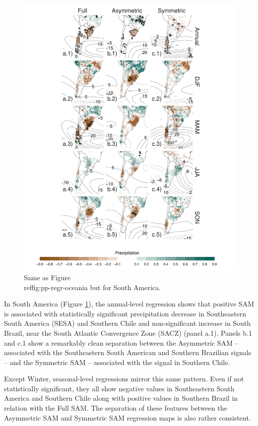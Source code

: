 \documentclass[smallextended]{svjour3}       %
\begin{document}
\begin{figure}
\includegraphics{pp-regr-america-1} \caption{Same as Figure \\ref{fig:pp-regr-oceania} but for South America.}\label{fig:pp-regr-america}
\end{figure}

In South America (Figure \ref{fig:pp-regr-america}), the annual-level regression shows that positive SAM is associated with statistically significant precipitation decrease in Southeastern South America (SESA) and Southern Chile and non-significant increase in South Brazil, near the South Atlantic Convergence Zone (SACZ) (panel a.1). Panels b.1 and c.1 show a remarkably clean separation between the Asymmetric SAM -- associated with the Southeastern South American and Southern Brazilian signals -- and the Symmetric SAM -- associated with the signal in Southern Chile.

Except Winter, seasonal-level regressions mirror this same pattern. Even if not statistically significant, they all show negative values in Southeastern South America and Southern Chile along with positive values in Southern Brazil in relation with the Full SAM. The separation of these features between the Asymmetric SAM and Symmetric SAM regression maps is also rather consistent.
\end{document}

